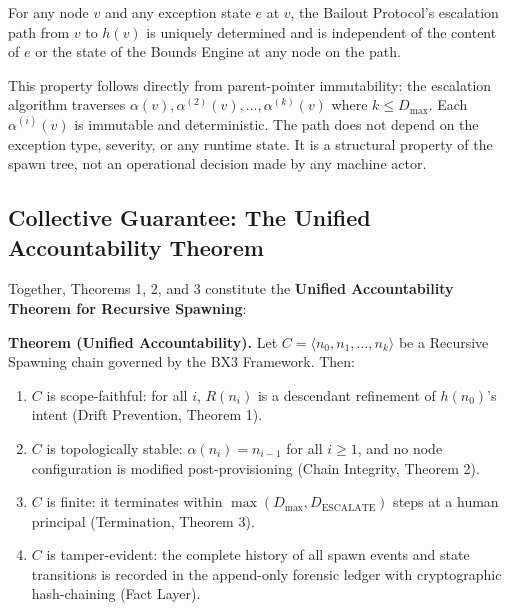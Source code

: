 \begin{property}
\label{prop:deterministic-escalation}
For any node $v$ and any exception state $e$ at $v$, the Bailout Protocol's escalation path from $v$ to $h(v)$ is uniquely determined and is independent of the content of $e$ or the state of the Bounds Engine at any node on the path.
\end{property}

This property follows directly from parent-pointer immutability: the escalation algorithm traverses $\alpha(v), \alpha^{(2)}(v), \ldots, \alpha^{(k)}(v)$ where $k \leq D_{\mathrm{max}}$. Each $\alpha^{(i)}(v)$ is immutable and deterministic. The path does not depend on the exception type, severity, or any runtime state. It is a structural property of the spawn tree, not an operational decision made by any machine actor.

\subsection{Collective Guarantee: The Unified Accountability Theorem}
\label{sec:rs-unified-theorem}

Together, Theorems 1, 2, and 3 constitute the \textbf{Unified Accountability Theorem for Recursive Spawning}:

\medskip
\noindent\textbf{Theorem (Unified Accountability).} Let $C = \langle n_0, n_1, \ldots, n_k \rangle$ be a Recursive Spawning chain governed by the BX3 Framework. Then:

\begin{enumerate}
    \item $C$ is scope-faithful: for all $i$, $R(n_i)$ is a descendant refinement of $h(n_0)$'s intent (Drift Prevention, Theorem 1).
    \item $C$ is topologically stable: $\alpha(n_i) = n_{i-1}$ for all $i \geq 1$, and no node configuration is modified post-provisioning (Chain Integrity, Theorem 2).
    \item $C$ is finite: it terminates within $\max(D_{\mathrm{max}}, D_{\mathrm{ESCALATE}})$ steps at a human principal (Termination, Theorem 3).
    \item $C$ is tamper-evident: the complete history of all spawn events and state transitions is recorded in the append-only forensic ledger with cryptographic hash-chaining (Fact Layer).
\end{enumerate}

